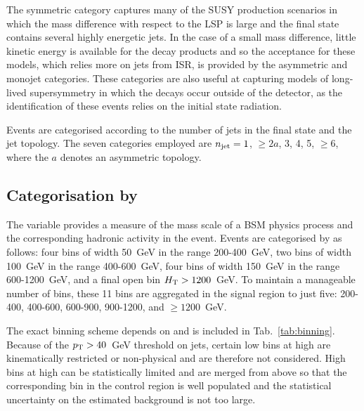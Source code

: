 The symmetric category captures many of the SUSY production scenarios in which 
the mass difference with respect to the LSP is large and the final state 
contains several highly energetic jets. In the case of a small mass difference, 
little kinetic energy is available for the decay products and so the acceptance 
for these models, which relies more on jets from ISR, is provided by the 
asymmetric and monojet categories. 
These categories are also useful at capturing models of long-lived 
supersymmetry in which the decays occur outside of the detector, as the  
identification of these events relies on the initial state radiation.

Events are categorised according to the number of jets in the final state and 
the jet topology. The seven categories employed are $n_{\text{jet}} = 1$, $\geq2a$, 3, 
4, 5, $\geq6$, where the $a$ denotes an asymmetric topology.

\subsection*{Categorisation by \scalht}

The \scalht variable provides a measure of the mass scale of a BSM physics 
process and the corresponding hadronic activity in the event. Events are 
categorised by \scalht as follows: four bins of width 50~GeV in the range 
200-400~GeV, two bins of width 100~GeV in the range 400-600~GeV, four bins of 
width 150~GeV in the range 600-1200~GeV, and a final open bin 
$\mbox{$H_\text{T}$}>1200$~GeV. 
To maintain a manageable number of bins,
these 11 bins are aggregated in the signal region to just five: 200-400, 
400-600, 
600-900, 900-1200, and $\geq1200$~GeV.

The exact \scalht binning scheme depends on \njet and is included in 
Tab.~\ref{tab:binning}. Because of the ${p_{\text T}}>40$~GeV threshold on jets, certain 
low \scalht bins at high \njet are kinematically restricted or non-physical and 
are therefore 
not considered. High \scalht bins at high \njet can be statistically limited 
and are merged from above so that the corresponding bin in the control region 
is well populated and the statistical uncertainty on the estimated background  
is not too large.

